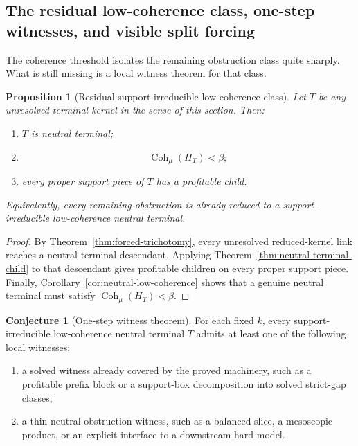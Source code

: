 \documentclass[11pt]{article}
\newtheorem{proposition}[theorem]{Proposition}
\theoremstyle{definition}
\newtheorem{conjecture}[theorem]{Conjecture}
\newcommand{\1}{\mathbf{1}}
\begin{document}
\subsection*{The residual low-coherence class, one-step witnesses, and visible split forcing}
The coherence threshold isolates the remaining obstruction class quite sharply.
What is still missing is a local witness theorem for that class.

\begin{proposition}[Residual support-irreducible low-coherence class]\label{prop:low-coherence-residual-class}
Let $T$ be any unresolved terminal kernel in the sense of this section.
Then:
\begin{enumerate}[label=(\roman*),leftmargin=2.2em]
\item $T$ is neutral terminal;
\item
\[
\operatorname{Coh}_\mu(H_T)<\beta;
\]
\item every proper support piece of $T$ has a profitable child.
\end{enumerate}
Equivalently, every remaining obstruction is already reduced to a support-irreducible low-coherence neutral terminal.
\end{proposition}

\begin{proof}
By Theorem~\ref{thm:forced-trichotomy}, every unresolved reduced-kernel link reaches a neutral terminal descendant.
Applying Theorem~\ref{thm:neutral-terminal-child} to that descendant gives profitable children on every proper support piece.
Finally, Corollary~\ref{cor:neutral-low-coherence} shows that a genuine neutral terminal must satisfy $\operatorname{Coh}_\mu(H_T)<\beta$.
\end{proof}

\begin{conjecture}[One-step witness theorem]\label{conj:one-step-witness}
For each fixed $k$, every support-irreducible low-coherence neutral terminal $T$ admits at least one of the following local witnesses:
\begin{enumerate}[label=(\roman*),leftmargin=2.2em]
\item a solved witness already covered by the proved machinery, such as a profitable prefix block or a support-box decomposition into solved strict-gap classes;
\item a thin neutral obstruction witness, such as a balanced slice, a mesoscopic product, or an explicit interface to a downstream hard model.
\end{enumerate}
\end{conjecture}
\end{document}
